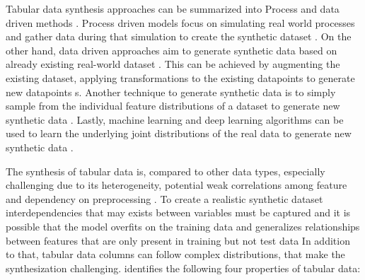 Tabular data synthesis approaches can be summarized into Process and data driven methods \cite{goncalves2020GenerationEvaluationSynthetic}.
Process driven models focus on simulating real world processes and gather data during that simulation to create the synthetic dataset \cite{kowalczyk2022TaxonomyUseSynthetic}.
On the other hand, data driven approaches aim to generate synthetic data based on already existing real-world dataset \cite{kowalczyk2022TaxonomyUseSynthetic}.
This can be achieved by augmenting the existing dataset, \ie applying transformations to the existing datapoints to generate new datapoints \cite{kowalczyk2022TaxonomyUseSynthetic}s.
Another technique to generate synthetic data is to simply sample from the individual feature distributions of a dataset to generate new synthetic data \cite{kowalczyk2022TaxonomyUseSynthetic}.
Lastly, machine learning and deep learning algorithms can be used to learn the underlying joint distributions of the real data to generate new synthetic data \cite{kowalczyk2022TaxonomyUseSynthetic}. 

The synthesis of tabular data is, compared to other data types, especially challenging due to its heterogeneity, potential weak correlations among feature and dependency on preprocessing \cite{borisov2022DeepNeuralNetworks, yoon2020VIMEExtendingSuccess, gorishniy2022EmbeddingsNumericalFeatures}.
To create a realistic synthetic dataset interdependencies that may exists between variables must be captured and 
it is possible that the \gls{model} overfits on the training data and generalizes relationships between features that are only present in training but not test data \cite{lederrey2022DATGANIntegratingExperta}
In addition to that, tabular data columns can follow complex distributions, that make the synthesization challenging.
\cite{zhao2022CTABGANEnhancingTabular} identifies the following four properties of tabular data:

